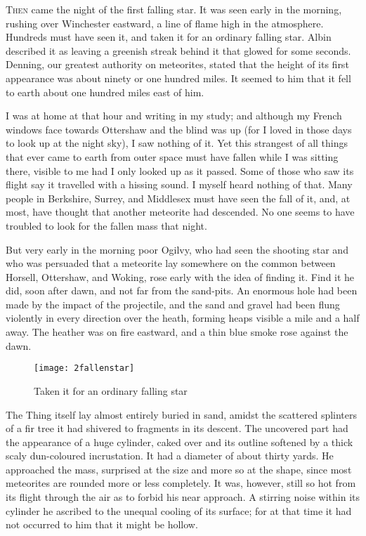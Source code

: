 


\lettrine[lines=4,findent=2pt]{T}{hen} came the night of the first falling star. It was seen early in the morning, rushing over Winchester eastward, a line of flame high in the atmosphere. Hundreds must have seen it, and taken it for an ordinary falling star. Albin described it as leaving a greenish streak behind it that glowed for some seconds. Denning, our greatest authority on meteorites, stated that the height of its first appearance was about ninety or one hundred miles. It seemed to him that it fell to earth about one hundred miles east of him.

I was at home at that hour and writing in my study; and although my French windows face towards Ottershaw and the blind was up (for I loved in those days to look up at the night sky), I saw nothing of it. Yet this strangest of all things that ever came to earth from outer space must have fallen while I was sitting there, visible to me had I only looked up as it passed. Some of those who saw its flight say it travelled with a hissing sound. I myself heard nothing of that. Many people in Berkshire, Surrey, and Middlesex must have seen the fall of it, and, at most, have thought that another meteorite had descended. No one seems to have troubled to look for the fallen mass that night.

But very early in the morning poor Ogilvy, who had seen the shooting star and who was persuaded that a meteorite lay somewhere on the common between Horsell, Ottershaw, and Woking, rose early with the idea of finding it. Find it he did, soon after dawn, and not far from the sand-pits. An enormous hole had been made by the impact of the projectile, and the sand and gravel had been flung violently in every direction over the heath, forming heaps visible a mile and a half away. The heather was on fire eastward, and a thin blue smoke rose against the dawn.

\begin{sidewaysfigure}
	\texttt{[image: 2fallenstar]}%
	\caption{Taken it for an ordinary falling star}
\end{sidewaysfigure}

The Thing itself lay almost entirely buried in sand, amidst the scattered splinters of a fir tree it had shivered to fragments in its descent. The uncovered part had the appearance of a huge cylinder, caked over and its outline softened by a thick scaly dun-coloured incrustation. It had a diameter of about thirty yards. He approached the mass, surprised at the size and more so at the shape, since most meteorites are rounded more or less completely. It was, however, still so hot from its flight through the air as to forbid his near approach. A stirring noise within its cylinder he ascribed to the unequal cooling of its surface; for at that time it had not occurred to him that it might be hollow.

